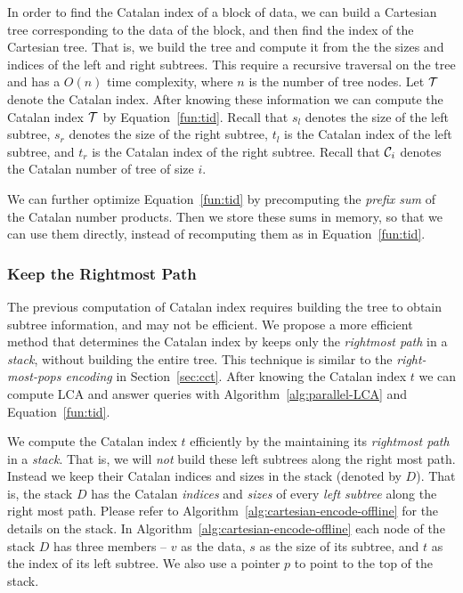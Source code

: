 In order to find the Catalan index of a block of data, we can build a
Cartesian tree corresponding to the data of the block, and then find
the index of the Cartesian tree.  That is, we build the tree and
compute it from the the sizes and indices of the left and right
subtrees.  This require a recursive traversal on the tree and has a
$O(n)$ time complexity, where $n$ is the number of tree nodes.  Let
$\cal T$ denote the Catalan index.  After knowing these information we
can compute the Catalan index $\cal T$ by Equation~\ref{fun:tid}.
Recall that $s_l$ denotes the size of the left subtree, $s_r$ denotes
the size of the right subtree, $t_l$ is the Catalan index of the left
subtree, and $t_r$ is the Catalan index of the right subtree.  Recall
that ${\cal C}_i$ denotes the Catalan number of tree of size $i$.

% 



We can further optimize Equation~\ref{fun:tid} by precomputing the
{\em prefix sum} of the Catalan number products.  Then we store these
sums in memory, so that we can use them directly, instead of
recomputing them as in Equation~\ref{fun:tid}.  


\subsubsection{Keep the Rightmost Path}

The previous computation of Catalan index requires building the tree
to obtain subtree information, and may not be efficient.  We propose a
more efficient method that determines the Catalan index by keeps only
the {\em rightmost path} in a {\em stack}, without building the entire
tree.  This technique is similar to the {\em right-most-pops encoding}
in Section~\ref{sec:cct}.  After knowing the Catalan index $t$ we can
compute LCA and answer queries with Algorithm~\ref{alg:parallel-LCA}
and Equation~\ref{fun:tid}.

We compute the Catalan index $t$ efficiently by the maintaining its
{\em rightmost path} in a {\em stack}.  That is, we will {\em not}
build these left subtrees along the right most path.  Instead we keep
their Catalan indices and sizes in the stack (denoted by $D$).  That
is, the stack $D$ has the Catalan {\em indices} and {\em sizes} of
every {\em left subtree} along the right most path.  Please refer to
Algorithm~\ref{alg:cartesian-encode-offline} for the details on the
stack.  In Algorithm~\ref{alg:cartesian-encode-offline} each node of
the stack $D$ has three members -- $v$ as the data, $s$ as the size of
its subtree, and $t$ as the index of its left subtree.  We also use a
pointer $p$ to point to the top of the stack.

